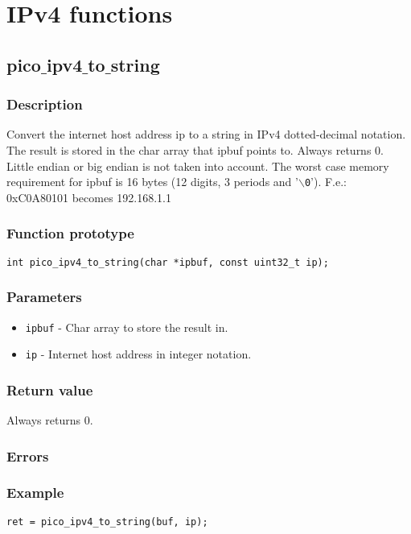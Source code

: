 \section{IPv4 functions}


\subsection{pico$\_$ipv4$\_$to$\_$string}

\subsubsection*{Description}
Convert the internet host address ip to a string in IPv4 dotted-decimal notation.
The result is stored in the char array that ipbuf points to. Always returns 0. Little
endian or big endian is not taken into account. The worst case memory requirement for
ipbuf is 16 bytes (12 digits, 3 periods and '\texttt{$\backslash$0}'). F.e.: 0xC0A80101 becomes 192.168.1.1

\subsubsection*{Function prototype}
\begin{verbatim}
int pico_ipv4_to_string(char *ipbuf, const uint32_t ip);
\end{verbatim}

\subsubsection*{Parameters}
\begin{itemize}
\item \texttt{ipbuf} - Char array to store the result in.
\item \texttt{ip} - Internet host address in integer notation.
\end{itemize}

\subsubsection*{Return value}
Always returns 0.

\subsubsection*{Errors}

\subsubsection*{Example}
\begin{verbatim}
ret = pico_ipv4_to_string(buf, ip);
\end{verbatim}



